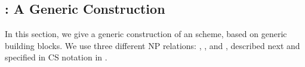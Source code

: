 

\subsection{\CUASGen: A Generic \UAS Construction}
\label{ssec:generic-construction-uas}

In this section, we give a generic construction of an \UAS scheme, based on
generic building blocks. We use three different NP relations:
\RelIss, \RelSig, and \RelIns, described next
and specified in CS notation \cite{cs97} in .


